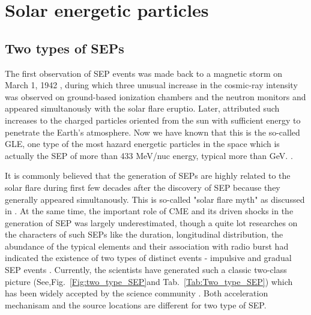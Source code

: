 \section{Solar energetic particles}

\subsection{Two types of SEPs}


The first observation of \ac{SEP} events was made back to a magnetic storm on March 1, 1942 \citep{lange1942note,forbush1942further}, during which three unusual increase in the cosmic-ray intensity was observed on ground-based ionization chambers and the neutron monitors and appeared simultanously with the solar flare eruptio. Later, \cite{Forbush1946} attributed such increases to the charged particles oriented from the sun with sufficient energy to penetrate the Earth's atmosphere. Now we have known that this is the so-called \ac{GLE}, one type of the most hazard energetic particles in the space which is actually the \ac{SEP} of more than 433 MeV/nuc energy, typical more than GeV. \citep{meyer1956solar,Shea2012SSRv,gopalswamy2013first,thakur2014ground, Reames2013}.

It is commonly believed that the generation of \acp{SEP} are highly related to the solar flare during first few decades after the discovery of \ac{SEP} because they generally appeared simultanously. This is so-called "solar flare myth" as discussed in \citep{gosling1993the}. At the same time, the important role of CME and its driven shocks in the generation of \ac{SEP} was largely underestimated, though a quite lot researches on the characters of such \acp{SEP} like the duration, longitudinal distribution, the abundance of the typical elements and their association with radio burst had indicated the existence of two types of distinct events - impulsive and gradual \ac{SEP} events \citep{kahler1978prompt,kahler1984associations,cliver1982injection,cane1986two, reames1988ApJ}.
Currently, the scientists have generated such a classic two-class picture (See,Fig.~\ref{Fig:two_type_SEP}and Tab.~\ref{Tab:Two_type_SEP}) which has been widely accepted by the science community \citep{kallenrode2003current, reames2013two,Desai_Diacalone2016LRSP, Reames2021LNP}. Both acceleration mechanisam and the source locations are different for two type of \ac{SEP}.


